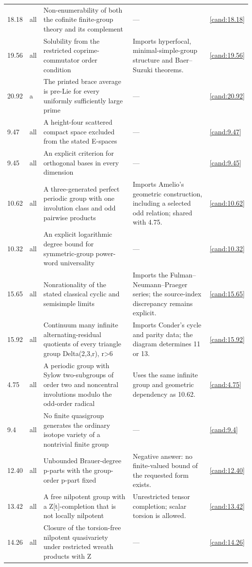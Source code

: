 \begin{longtable}{@{}p{}p{}>{\raggedright\arraybackslash}p{}>{\raggedright\arraybackslash}p{}p{}@{}}
18.18 & all & Non-enumerability of both the cofinite finite-group theory and its complement & --- & \ref{cand:18.18} \\
19.56 & all & Solubility from the restricted coprime-commutator order condition & Imports hyperfocal, minimal-simple-group structure and Baer--Suzuki theorems. & \ref{cand:19.56} \\
20.92 & a & The printed brace average is pre-Lie for every uniformly sufficiently large prime & --- & \ref{cand:20.92} \\
9.47 & all & A height-four scattered compact space excluded from the stated E-spaces & --- & \ref{cand:9.47} \\
9.45 & all & An explicit criterion for orthogonal bases in every dimension & --- & \ref{cand:9.45} \\
10.62 & all & A three-generated perfect periodic group with one involution class and odd pairwise products & Imports Amelio's geometric construction, including a selected odd relation; shared with 4.75. & \ref{cand:10.62} \\
10.32 & all & An explicit logarithmic degree bound for symmetric-group power-word universality & --- & \ref{cand:10.32} \\
15.65 & all & Nonrationality of the stated classical cyclic and semisimple limits & Imports the Fulman--Neumann--Praeger series; the source-index discrepancy remains explicit. & \ref{cand:15.65} \\
15.92 & all & Continuum many infinite alternating-residual quotients of every triangle group Delta(2,3,r), r>6 & Imports Conder's cycle and parity data; the diagram determines 11 or 13. & \ref{cand:15.92} \\
4.75 & all & A periodic group with Sylow two-subgroups of order two and noncentral involutions modulo the odd-order radical & Uses the same infinite group and geometric dependency as 10.62. & \ref{cand:4.75} \\
9.4 & all & No finite quasigroup generates the ordinary isotope variety of a nontrivial finite group & --- & \ref{cand:9.4} \\
12.40 & all & Unbounded Brauer-degree p-parts with the group-order p-part fixed & Negative answer: no finite-valued bound of the requested form exists. & \ref{cand:12.40} \\
13.42 & all & A free nilpotent group with a Z[t]-completion that is not locally nilpotent & Unrestricted tensor completion; scalar torsion is allowed. & \ref{cand:13.42} \\
14.26 & all & Closure of the torsion-free nilpotent quasivariety under restricted wreath products with Z & --- & \ref{cand:14.26} \\

\end{longtable}
